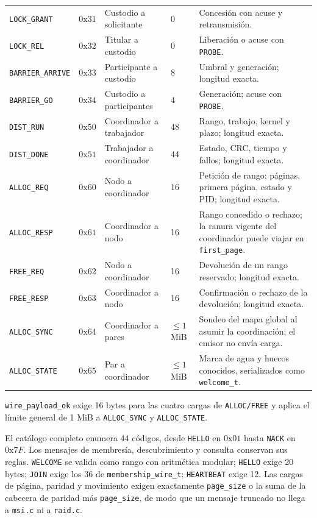 \documentclass[11pt,spanish]{article}
\begin{document}
{\begin{xltabular}{\linewidth}{l l l l Y}
\texttt{LOCK\_GRANT} & $0\text{x}31$ & Custodio a solicitante & 0 & Concesión con acuse y retransmisión. \\
\texttt{LOCK\_REL} & $0\text{x}32$ & Titular a custodio & 0 & Liberación o acuse con \texttt{PROBE}. \\
\texttt{BARRIER\_ARRIVE} & $0\text{x}33$ & Participante a custodio & 8 & Umbral y generación; longitud exacta. \\
\texttt{BARRIER\_GO} & $0\text{x}34$ & Custodio a participantes & 4 & Generación; acuse con \texttt{PROBE}. \\
\texttt{DIST\_RUN} & $0\text{x}50$ & Coordinador a trabajador & 48 & Rango, trabajo, kernel y plazo; longitud exacta. \\
\texttt{DIST\_DONE} & $0\text{x}51$ & Trabajador a coordinador & 44 & Estado, CRC, tiempo y fallos; longitud exacta. \\
\texttt{ALLOC\_REQ} & $0\text{x}60$ & Nodo a coordinador & 16 & Petición de rango; páginas, primera página, estado y PID; longitud exacta. \\
\texttt{ALLOC\_RESP} & $0\text{x}61$ & Coordinador a nodo & 16 & Rango concedido o rechazo; la ranura vigente del coordinador puede viajar en \texttt{first\_page}. \\
\texttt{FREE\_REQ} & $0\text{x}62$ & Nodo a coordinador & 16 & Devolución de un rango reservado; longitud exacta. \\
\texttt{FREE\_RESP} & $0\text{x}63$ & Coordinador a nodo & 16 & Confirmación o rechazo de la devolución; longitud exacta. \\
\texttt{ALLOC\_SYNC} & $0\text{x}64$ & Coordinador a pares & $\leq 1$ MiB & Sondeo del mapa global al asumir la coordinación; el emisor no envía carga. \\
\texttt{ALLOC\_STATE} & $0\text{x}65$ & Par a coordinador & $\leq 1$ MiB & Marca de agua y huecos conocidos, serializados como \texttt{welcome\_t}. \\
\bottomrule
\end{xltabular}
}

\texttt{wire\_payload\_ok} exige 16 bytes para las cuatro cargas de \texttt{ALLOC/FREE} y aplica el límite general de 1 MiB a \texttt{ALLOC\_SYNC} y \texttt{ALLOC\_STATE}.

El catálogo completo enumera 44 códigos, desde \texttt{HELLO} en $0\text{x}01$ hasta \texttt{NACK} en $0\text{x}7F$. Los mensajes de membresía, descubrimiento y consulta conservan sus reglas. \texttt{WELCOME} se valida como rango con aritmética modular; \texttt{HELLO} exige 20 bytes; \texttt{JOIN} exige los 36 de \texttt{membership\_wire\_t}; \texttt{HEARTBEAT} exige 12. Las cargas de página, paridad y movimiento exigen exactamente \texttt{page\_size} o la suma de la cabecera de paridad más \texttt{page\_size}, de modo que un mensaje truncado no llega a \texttt{msi.c} ni a \texttt{raid.c}.
\end{document}
